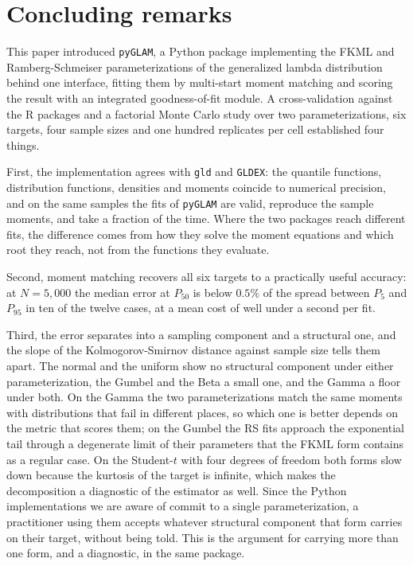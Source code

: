 \section{Concluding remarks}\label{sec:conclusions}

This paper introduced \texttt{pyGLAM}, a Python package implementing the FKML and
Ramberg-Schmeiser parameterizations of the generalized lambda distribution behind
one interface, fitting them by multi-start moment matching and scoring the result
with an integrated goodness-of-fit module. A cross-validation against the R
packages and a factorial Monte Carlo study over two parameterizations, six
targets, four sample sizes and one hundred replicates per cell established four
things.

First, the implementation agrees with \texttt{gld} and \texttt{GLDEX}: the
quantile functions, distribution functions, densities and moments coincide to
numerical precision, and on the same samples the fits of \texttt{pyGLAM} are
valid, reproduce the sample moments, and take a fraction of the time. Where the
two packages reach different fits, the difference comes from how they solve the
moment equations and which root they reach, not from the functions they
evaluate.

Second, moment matching recovers all six targets to a practically useful
accuracy: at $N = 5{,}000$ the median error at $P_{50}$ is below $0.5\%$ of the
spread between $P_5$ and $P_{95}$ in ten of the twelve cases, at a mean cost of
well under a second per fit.

Third, the error separates into a sampling component and a structural one, and
the slope of the Kolmogorov-Smirnov distance against sample size tells them
apart. The normal and the uniform show no structural component under either
parameterization, the Gumbel and the Beta a small one, and the Gamma a floor
under both. On the Gamma the two parameterizations match the same moments with
distributions that fail in different places, so which one is better depends on
the metric that scores them; on the Gumbel the RS fits approach the exponential
tail through a degenerate limit of their parameters that the FKML form contains
as a regular case. On the Student-$t$ with four degrees of freedom both forms
slow down because the kurtosis of the target is infinite, which makes the
decomposition a diagnostic of the estimator as well. Since the Python
implementations we are aware of commit to a single parameterization, a
practitioner using them accepts whatever structural component that form carries
on their target, without being told. This is the argument for carrying more than
one form, and a diagnostic, in the same package.

